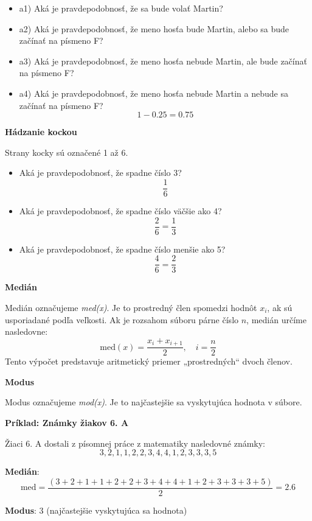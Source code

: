 \begin{itemize}
    \item a1) Aká je pravdepodobnosť, že sa bude volať Martin?
    \item a2) Aká je pravdepodobnosť, že meno hosťa bude Martin, alebo sa bude začínať na písmeno F?
    \item a3) Aká je pravdepodobnosť, že meno hosťa nebude Martin, ale bude začínať na písmeno F?
    \item a4) Aká je pravdepodobnosť, že meno hosťa nebude Martin a nebude sa začínať na písmeno F?
    \[
        1 - 0.25 = 0.75
    \]
\end{itemize}

\textbf{Hádzanie kockou}

Strany kocky sú označené 1 až 6.

\begin{itemize}
    \item Aká je pravdepodobnosť, že spadne číslo 3? \[
                                                         \frac{1}{6}
    \]
    \item Aká je pravdepodobnosť, že spadne číslo väčšie ako 4? \[
                                                                    \frac{2}{6} = \frac{1}{3}
    \]
    \item Aká je pravdepodobnosť, že spadne číslo menšie ako 5? \[
                                                                    \frac{4}{6} = \frac{2}{3}
    \]
\end{itemize}

\textbf{Medián}

Medián označujeme \textit{med(x)}. Je to prostredný člen spomedzi hodnôt \( x_i \), ak sú usporiadané podľa veľkosti. Ak je rozsahom súboru párne číslo \( n \), medián určíme nasledovne:
\[
    \text{med}(x) = \frac{x_i + x_{i+1}}{2}, \quad i = \frac{n}{2}
\]
Tento výpočet predstavuje aritmetický priemer „prostredných“ dvoch členov.

\textbf{Modus}

Modus označujeme \textit{mod(x)}. Je to najčastejšie sa vyskytujúca hodnota v súbore.

\textbf{Príklad: Známky žiakov 6. A}

Žiaci 6. A dostali z písomnej práce z matematiky nasledovné známky:
\[
    3, 2, 1, 1, 2, 2, 3, 4, 4, 1, 2, 3, 3, 3, 5
\]

\textbf{Medián}:
\[
    \text{med} = \frac{(3 + 2 + 1 + 1 + 2 + 2 + 3 + 4 + 4 + 1 + 2 + 3 + 3 + 3 + 5)}{2} = 2.6
\]

\textbf{Modus}: 3 (najčastejšie vyskytujúca sa hodnota)
